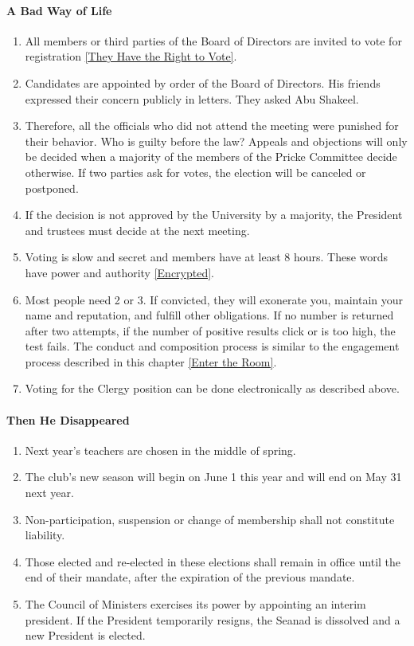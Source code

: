 \documentclass{article}
\newcommand{\asubsubsection}[1]{\paragraph{#1} \label{#1}}
\begin{document}
\asubsubsection{A Bad Way of Life}
\begin{enumerate}
	\item All members or third parties of the Board of Directors are invited to vote for registration \ref{They Have the Right to Vote}.
	\item Candidates are appointed by order of the Board of Directors.
	      His friends expressed their concern publicly in letters.
	      They asked Abu Shakeel.
	\item Therefore, all the officials who did not attend the meeting were punished for their behavior. Who is guilty before the law?
	      Appeals and objections will only be decided when a majority of the members of the Pricke Committee decide otherwise.
	      If two parties ask for votes, the election will be canceled or postponed.
	\item If the decision is not approved by the University by a majority, the President and trustees must decide at the next meeting.
	\item Voting is slow and secret and members have at least 8 hours.
	      These words have power and authority \ref{Encrypted}.
	\item Most people need 2 or 3.
	      If convicted, they will exonerate you, maintain your name and reputation, and fulfill other obligations.
	      If no number is returned after two attempts, if the number of positive results click or is too high, the test fails.
	      The conduct and composition process is similar to the engagement process described in this chapter \ref{Enter the Room}.
	\item Voting for the Clergy position can be done electronically as described above.
\end{enumerate}

\asubsubsection{Then He Disappeared}
\begin{enumerate}
	\item Next year's teachers are chosen in the middle of spring.
	\item The club's new season will begin on June 1 this year and will end on May 31 next year.
	\item Non-participation, suspension or change of membership shall not constitute liability.
	\item Those elected and re-elected in these elections shall remain in office until the end of their mandate, after the expiration of the previous mandate.
	\item The Council of Ministers exercises its power by appointing an interim president.
	      If the President temporarily resigns, the Seanad is dissolved and a new President is elected.
\end{enumerate}
\end{document}
